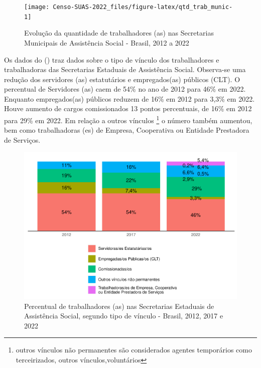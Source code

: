 \documentclass[
  brazilian]{report}
\begin{document}
\begin{figure}
\texttt{[image: Censo-SUAS-2022\_files/figure-latex/qtd\_trab\_munic-1]} \caption[Evolução da quantidade de trabalhadores (as) nas Secretarias Municipais de Assistência Social - Brasil, 2012 a 2022]{Evolução da quantidade de trabalhadores (as) nas Secretarias Municipais de Assistência Social - Brasil, 2012 a 2022}\label{fig:qtd_trab_munic}
\end{figure}

Os dados do () traz dados sobre o tipo de vínculo
dos trabalhadores e trabalhadoras das Secretarias Estaduais de
Assistência Social. Observa-se uma redução dos servidores (as)
estatutários e empregados(as) públicos (CLT). O percentual de Servidores
(as) caem de 54\% no ano de 2012 para 46\% em 2022. Enquanto
empregados(as) públicos reduzem de 16\% em 2012 para 3,3\% em 2022.
Houve aumento de cargos comissionados 13 pontos percentuais, de 16\% em
2012 para 29\% em 2022. Em relação a outros vínculos
\footnote{outros vínculos não permanentes são considerados agentes temporários como terceirizados, outros vínculos,voluntários}
o número também aumentou, bem como trabalhadoras (es) de Empresa,
Cooperativa ou Entidade Prestadora de Serviços.

\begin{figure}
\includegraphics{Censo-SUAS-2022_files/figure-latex/uf_trab_vin-1} \caption[Percentual de trabalhadores (as) nas Secretarias Estaduais de Assistência Social, segundo tipo de vínculo - Brasil, 2012, 2017 e 2022]{Percentual de trabalhadores (as) nas Secretarias Estaduais de Assistência Social, segundo tipo de vínculo - Brasil, 2012, 2017 e 2022}\label{fig:uf_trab_vin}
\end{figure}
\end{document}
